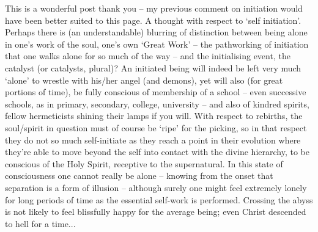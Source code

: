 \begin{footnotesize}
\begin{sffamily}
This is a wonderful post thank you -- my previous comment on initiation would have been better suited to this page. A thought with respect to `self initiation'. Perhaps there is (an understandable) blurring of distinction between being alone in one's work of the soul, one's own `Great Work' -- the pathworking of initiation that one walks alone for so much of the way -- and the initialising event, the catalyst (or catalysts, plural)? An initiated being will indeed be left very much `alone' to wrestle with his/her angel (and demons), yet will also (for great portions of time), be fully conscious of membership of a school -- even successive schools, as in primary, secondary, college, university -- and also of kindred spirits, fellow hermeticists shining their lamps if you will. With respect to rebirths, the soul/spirit in question must of course be `ripe' for the picking, so in that respect they do not so much self-initiate as they reach a point in their evolution where they're able to move beyond the self into contact with the divine hierarchy, to be conscious of the Holy Spirit, receptive to the supernatural. In this state of consciousness one cannot really be alone -- knowing from the onset that separation is a form of illusion -- although surely one might feel extremely lonely for long periods of time as the essential self-work is performed. Crossing the abyss is not likely to feel blissfully happy for the average being; even Christ descended to hell for a time... 

\hfill

\end{sffamily}
\end{footnotesize}


